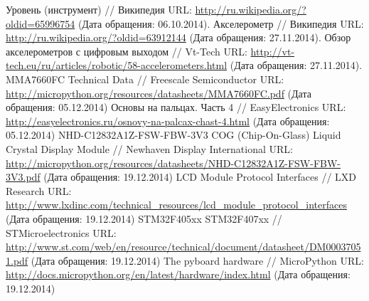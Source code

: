 \documentclass[document.tex]{subfiles}
\begin{document}
\clearpage
\renewcommand\refname{Список использованных источников}
\begin{thebibliography}{@@@@}	
		Уровень (инструмент) // Википедия
		URL: {\url{http://ru.wikipedia.org/?oldid=65996754}} 
		(Дата обращения: 06.10.2014).
		Акселерометр // Википедия
		URL: {\url{http://ru.wikipedia.org/?oldid=63912144}}
		(Дата обращения: 27.11.2014).
		Обзор акселерометров с цифровым выходом // Vt-Tech
		URL: {\url{http://vt-tech.eu/ru/articles/robotic/58-accelerometers.html}}
		(Дата обращения: 27.11.2014).
		MMA7660FC Technical Data // Freescale Semiconductor
		URL: {\url{http://micropython.org/resources/datasheets/MMA7660FC.pdf}}
		(Дата обращения: 05.12.2014)
		Основы на пальцах. Часть 4 // EasyElectronics
		URL: {\url{http://easyelectronics.ru/osnovy-na-palcax-chast-4.html}}
		(Дата обращения: 05.12.2014)
		NHD-C12832A1Z-FSW-FBW-3V3 COG (Chip-On-Glass) Liquid Crystal Display Module // Newhaven Display International
		URL: {\url{http://micropython.org/resources/datasheets/NHD-C12832A1Z-FSW-FBW-3V3.pdf}}
		(Дата обращения: 19.12.2014)
		LCD Module Protocol Interfaces // LXD Research
		URL: {\url{http://www.lxdinc.com/technical_resources/lcd_module_protocol_interfaces}}
		(Дата обращения: 19.12.2014)
		STM32F405xx STM32F407xx // STMicroelectronics
		URL: {\url{http://www.st.com/web/en/resource/technical/document/datasheet/DM00037051.pdf}}
		(Дата обращения: 19.12.2014)
		The pyboard hardware // MicroPython
		URL: {\url{http://docs.micropython.org/en/latest/hardware/index.html}}
		(Дата обращения: 19.12.2014)
	\end{thebibliography}
\end{document}
